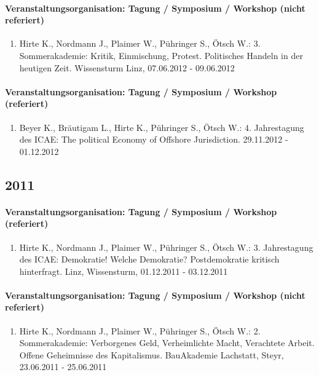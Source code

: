 \paragraph{Veranstaltungsorganisation: Tagung / Symposium / Workshop (nicht referiert)} 
\begin{enumerate}[leftmargin=*, labelsep=0.5cm] 
 	 \item Hirte K., Nordmann J., Plaimer W., Pühringer S., Ötsch W.: 3. Sommerakademie: Kritik, Einmischung, Protest. Politisches Handeln in der heutigen Zeit. Wissensturm Linz, 07.06.2012 - 09.06.2012 
\end{enumerate} 
\paragraph{Veranstaltungsorganisation: Tagung / Symposium / Workshop (referiert)} 
\begin{enumerate}[leftmargin=*, labelsep=0.5cm] 
 	 \item Beyer K., Bräutigam L., Hirte K., Pühringer S., Ötsch W.: 4. Jahrestagung des ICAE: The political Economy of Offshore Jurisdiction. 29.11.2012 - 01.12.2012 
\end{enumerate} 
\subsection*{2011} 
\paragraph{Veranstaltungsorganisation: Tagung / Symposium / Workshop (referiert)} 
\begin{enumerate}[leftmargin=*, labelsep=0.5cm] 
 	 \item Hirte K., Nordmann J., Plaimer W., Pühringer S., Ötsch W.: 3. Jahrestagung des ICAE: Demokratie! Welche Demokratie? Postdemokratie kritisch hinterfragt. Linz, Wissensturm, 01.12.2011 - 03.12.2011 
\end{enumerate} 
\paragraph{Veranstaltungsorganisation: Tagung / Symposium / Workshop (nicht referiert)} 
\begin{enumerate}[leftmargin=*, labelsep=0.5cm] 
 	 \item Hirte K., Nordmann J., Plaimer W., Pühringer S., Ötsch W.: 2. Sommerakademie: Verborgenes Geld, Verheimlichte Macht, Verachtete Arbeit. Offene Geheimnisse des Kapitalismus. BauAkademie Lachstatt, Steyr, 23.06.2011 - 25.06.2011 
\end{enumerate} 

